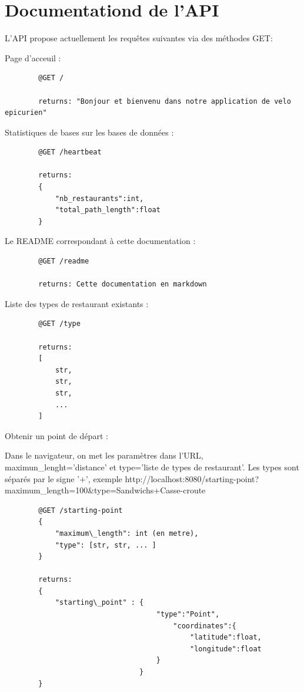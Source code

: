 \documentclass[12pt]{article}
\begin{document}
\section{Documentationd de l'API}

    L'API propose actuellement les requêtes suivantes via des méthodes GET:

    Page d'acceuil :

    \begin{lstlisting}
        @GET /

        returns: "Bonjour et bienvenu dans notre application de velo epicurien"
    \end{lstlisting}

    Statistiques de bases sur les bases de données :

    \begin{lstlisting}
        @GET /heartbeat

        returns:
        {
            "nb_restaurants":int,
            "total_path_length":float
        }
    \end{lstlisting}

    Le README correspondant à cette documentation :

    \begin{lstlisting}
        @GET /readme
        
        returns: Cette documentation en markdown
    \end{lstlisting}

    Liste des types de restaurant existants :
    
    \begin{lstlisting}
        @GET /type

        returns:
        [
            str,
            str,
            str,
            ...
        ]
    \end{lstlisting}

    Obtenir un point de départ : 

    Dans le navigateur, on met les paramètres dans l'URL, maximun\_lenght='distance' et type='liste de types de restaurant'. Les types sont séparés par le signe '+', exemple http://localhost:8080/starting-point?maximum\_length=100\&type=Sandwichs+Casse-croute

    \begin{lstlisting}
        @GET /starting-point
        {
            "maximum\_length": int (en metre),
            "type": [str, str, ... ]
        }

        returns:
        {
            "starting\_point" : {
                                    "type":"Point", 
                                        "coordinates":{
                                            "latitude":float, 
                                            "longitude":float
                                    }
                                }
        }
    \end{lstlisting}
\end{document}
